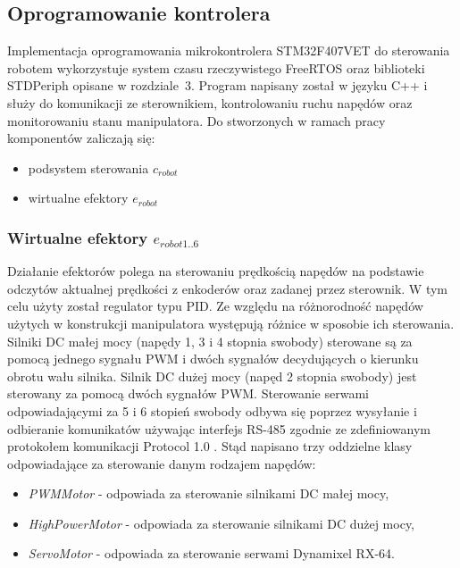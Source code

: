 \documentclass[a4paper, 12pt, twoside]{article}
\begin{document}
\subsection{Oprogramowanie kontrolera}

Implementacja oprogramowania mikrokontrolera STM32F407VET do sterowania robotem wykorzystuje system czasu rzeczywistego FreeRTOS oraz biblioteki STDPeriph opisane w rozdziale~3. Program napisany został w języku C++ i służy do komunikacji ze sterownikiem, kontrolowaniu ruchu napędów oraz monitorowaniu stanu manipulatora. Do stworzonych w ramach pracy komponentów zaliczają się:

\begin{itemize}
\item podsystem sterowania $c_{robot}$
\item wirtualne efektory $e_{robot}$
\end{itemize}

\subsubsection{Wirtualne efektory $e_{robot1..6}$}

Działanie efektorów polega na sterowaniu prędkością napędów na podstawie odczytów aktualnej prędkości z enkoderów oraz zadanej przez sterownik. W tym celu użyty został regulator typu PID. Ze względu na różnorodność napędów użytych w konstrukcji manipulatora występują różnice w sposobie ich sterowania. Silniki DC małej mocy (napędy 1, 3 i 4 stopnia swobody) sterowane są za pomocą jednego sygnału PWM i dwóch sygnałów decydujących o kierunku obrotu wału silnika. Silnik DC dużej mocy (napęd 2 stopnia swobody) jest sterowany za pomocą dwóch sygnałów PWM. Sterowanie serwami odpowiadającymi za 5 i 6 stopień swobody odbywa się poprzez wysyłanie i odbieranie komunikatów używając interfejs RS-485 zgodnie ze zdefiniowanym protokołem komunikacji Protocol 1.0 \cite{protocol}. Stąd napisano trzy oddzielne klasy odpowiadające za sterowanie danym rodzajem napędów:

\begin{itemize}
\item \textit{PWMMotor} - odpowiada za sterowanie silnikami DC małej mocy,
\item \textit{HighPowerMotor} - odpowiada za sterowanie silnikami DC dużej mocy,
\item \textit{ServoMotor} - odpowiada za sterowanie serwami Dynamixel RX-64.
\end{itemize}
\end{document}
